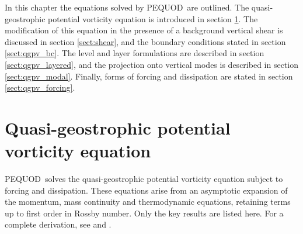 \documentclass[a4paper]{book}
\newcommand{\pequod}{PEQUOD}
\begin{document}
In this chapter the equations solved by \pequod\ are outlined. The
quasi-geostrophic potential vorticity equation is introduced in section
\ref{sect:qgpv}. The modification of this equation in the presence of a
background vertical shear is discussed in section \ref{sect:shear}, and the
boundary conditions stated in section \ref{sect:qgpv_bc}. The level and layer
formulations are described in section \ref{sect:qgpv_layered}, and the
projection onto vertical modes is described in section \ref{sect:qgpv_modal}.
Finally, forms of forcing and dissipation are stated in section
\ref{sect:qgpv_forcing}.

\section{Quasi-geostrophic potential vorticity equation}\label{sect:qgpv}

\pequod\ solves the quasi-geostrophic potential vorticity equation subject
to forcing and dissipation. These equations arise from an asymptotic expansion
of the momentum, mass continuity and thermodynamic equations, retaining
terms up to first order in Rossby number. Only the key results are listed here.
For a complete derivation, see \citet{pedlosky1987} and \citet{vallis2006}.
\end{document}
